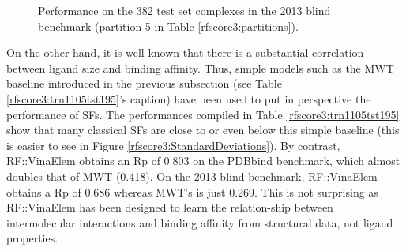 \begin{figure}
\centering
{}
\caption{Performance on the 382 test set complexes in the 2013 blind benchmark (partition 5 in Table \ref{rfscore3:partitions}).}
\label{rfscore3:partition5stat}
\end{figure}

On the other hand, it is well known that there is a substantial correlation between ligand size and binding affinity. Thus, simple models such as the MWT baseline introduced in the previous subsection (see Table \ref{rfscore3:trn1105tst195}'s caption) have been used to put in perspective the performance of SFs. The performances compiled in Table \ref{rfscore3:trn1105tst195} show that many classical SFs are close to or even below this simple baseline (this is easier to see in Figure \ref{rfscore3:StandardDeviations}). By contrast, RF::VinaElem obtains an Rp of 0.803 on the PDBbind benchmark, which almost doubles that of MWT (0.418). On the 2013 blind benchmark, RF::VinaElem obtains a Rp of 0.686 whereas MWT's is just 0.269. This is not surprising as RF::VinaElem has been designed to learn the relation-ship between intermolecular interactions and binding affinity from structural data, not ligand properties. 

